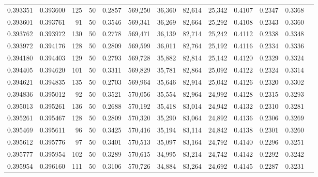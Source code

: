 \begin{tabular}{rrrrrrrrrrrrr}
0.393351 & 0.393600 &   125 &  50 &                                     0.2857 & 569,250 &  36,360 &  82,614 &  25,342 & 0.4107 & 0.2347 & 0.3368 \\
0.393601 & 0.393761 &    91 &  50 &                                     0.3546 & 569,341 &  36,269 &  82,664 &  25,292 & 0.4108 & 0.2343 & 0.3360 \\
0.393762 & 0.393972 &   130 &  50 &                                     0.2778 & 569,471 &  36,139 &  82,714 &  25,242 & 0.4112 & 0.2338 & 0.3348 \\
0.393972 & 0.394176 &   128 &  50 &                                     0.2809 & 569,599 &  36,011 &  82,764 &  25,192 & 0.4116 & 0.2334 & 0.3336 \\
0.394180 & 0.394403 &   129 &  50 &                                     0.2793 & 569,728 &  35,882 &  82,814 &  25,142 & 0.4120 & 0.2329 & 0.3324 \\
0.394405 & 0.394620 &   101 &  50 &                                     0.3311 & 569,829 &  35,781 &  82,864 &  25,092 & 0.4122 & 0.2324 & 0.3314 \\
0.394621 & 0.394835 &   135 &  50 &                                     0.2703 & 569,964 &  35,646 &  82,914 &  25,042 & 0.4126 & 0.2320 & 0.3302 \\
0.394836 & 0.395012 &    92 &  50 &                                     0.3521 & 570,056 &  35,554 &  82,964 &  24,992 & 0.4128 & 0.2315 & 0.3293 \\
0.395013 & 0.395261 &   136 &  50 &                                     0.2688 & 570,192 &  35,418 &  83,014 &  24,942 & 0.4132 & 0.2310 & 0.3281 \\
0.395261 & 0.395467 &   128 &  50 &                                     0.2809 & 570,320 &  35,290 &  83,064 &  24,892 & 0.4136 & 0.2306 & 0.3269 \\
0.395469 & 0.395611 &    96 &  50 &                                     0.3425 & 570,416 &  35,194 &  83,114 &  24,842 & 0.4138 & 0.2301 & 0.3260 \\
0.395612 & 0.395776 &    97 &  50 &                                     0.3401 & 570,513 &  35,097 &  83,164 &  24,792 & 0.4140 & 0.2296 & 0.3251 \\
0.395777 & 0.395954 &   102 &  50 &                                     0.3289 & 570,615 &  34,995 &  83,214 &  24,742 & 0.4142 & 0.2292 & 0.3242 \\
0.395954 & 0.396160 &   111 &  50 &                                     0.3106 & 570,726 &  34,884 &  83,264 &  24,692 & 0.4145 & 0.2287 & 0.3231 \\

\end{tabular}
